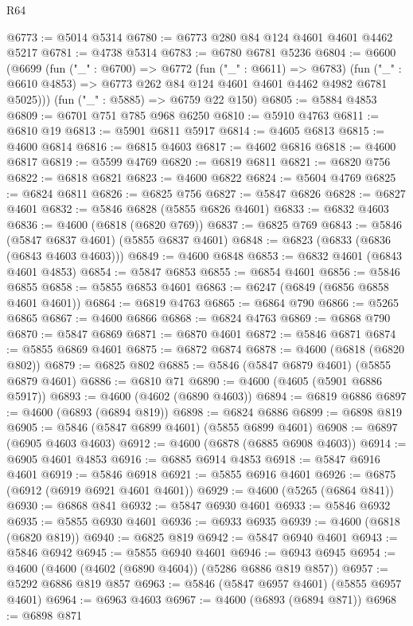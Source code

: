 \begin{lexlean}{R64}
\begin{coremodule}
@6773 := @5014 @5314
@6780 := @6773 @280 @84 @124 @4601 @4601 @4462 @5217
@6781 := @4738 @5314
@6783 := @6780 @6781 @5236
@6804 := @6600
    (@6699
      (fun ("_" : @6700) =>
      @6772
        (fun ("_" : @6611) => @6783)
        (fun ("_" : @6610 @4853) => @6773 @262 @84 @124 @4601 @4601 @4462 @4982 @6781 @5025)))
    (fun ("_" : @5885) => @6759 @22 @150)
@6805 := @5884 @4853
@6809 := @6701 @751 @785 @968 @6250
@6810 := @5910 @4763
@6811 := @6810 @19
@6813 := @5901 @6811 @5917
@6814 := @4605 @6813
@6815 := @4600 @6814
@6816 := @6815 @4603
@6817 := @4602 @6816
@6818 := @4600 @6817
@6819 := @5599 @4769
@6820 := @6819 @6811
@6821 := @6820 @756
@6822 := @6818 @6821
@6823 := @4600 @6822
@6824 := @5604 @4769
@6825 := @6824 @6811
@6826 := @6825 @756
@6827 := @5847 @6826
@6828 := @6827 @4601
@6832 := @5846 @6828 (@5855 @6826 @4601)
@6833 := @6832 @4603
@6836 := @4600 (@6818 (@6820 @769))
@6837 := @6825 @769
@6843 := @5846 (@5847 @6837 @4601) (@5855 @6837 @4601)
@6848 := @6823 (@6833 (@6836 (@6843 @4603 @4603)))
@6849 := @4600 @6848
@6853 := @6832 @4601 (@6843 @4601 @4853)
@6854 := @5847 @6853
@6855 := @6854 @4601
@6856 := @5846 @6855
@6858 := @5855 @6853 @4601
@6863 := @6247 (@6849 (@6856 @6858 @4601 @4601))
@6864 := @6819 @4763
@6865 := @6864 @790
@6866 := @5265 @6865
@6867 := @4600 @6866
@6868 := @6824 @4763
@6869 := @6868 @790
@6870 := @5847 @6869
@6871 := @6870 @4601
@6872 := @5846 @6871
@6874 := @5855 @6869 @4601
@6875 := @6872 @6874
@6878 := @4600 (@6818 (@6820 @802))
@6879 := @6825 @802
@6885 := @5846 (@5847 @6879 @4601) (@5855 @6879 @4601)
@6886 := @6810 @71
@6890 := @4600 (@4605 (@5901 @6886 @5917))
@6893 := @4600 (@4602 (@6890 @4603))
@6894 := @6819 @6886
@6897 := @4600 (@6893 (@6894 @819))
@6898 := @6824 @6886
@6899 := @6898 @819
@6905 := @5846 (@5847 @6899 @4601) (@5855 @6899 @4601)
@6908 := @6897 (@6905 @4603 @4603)
@6912 := @4600 (@6878 (@6885 @6908 @4603))
@6914 := @6905 @4601 @4853
@6916 := @6885 @6914 @4853
@6918 := @5847 @6916 @4601
@6919 := @5846 @6918
@6921 := @5855 @6916 @4601
@6926 := @6875 (@6912 (@6919 @6921 @4601 @4601))
@6929 := @4600 (@5265 (@6864 @841))
@6930 := @6868 @841
@6932 := @5847 @6930 @4601
@6933 := @5846 @6932
@6935 := @5855 @6930 @4601
@6936 := @6933 @6935
@6939 := @4600 (@6818 (@6820 @819))
@6940 := @6825 @819
@6942 := @5847 @6940 @4601
@6943 := @5846 @6942
@6945 := @5855 @6940 @4601
@6946 := @6943 @6945
@6954 := @4600 (@4600 (@4602 (@6890 @4604)) (@5286 @6886 @819 @857))
@6957 := @5292 @6886 @819 @857
@6963 := @5846 (@5847 @6957 @4601) (@5855 @6957 @4601)
@6964 := @6963 @4603
@6967 := @4600 (@6893 (@6894 @871))
@6968 := @6898 @871

\end{coremodule}
\end{lexlean}
